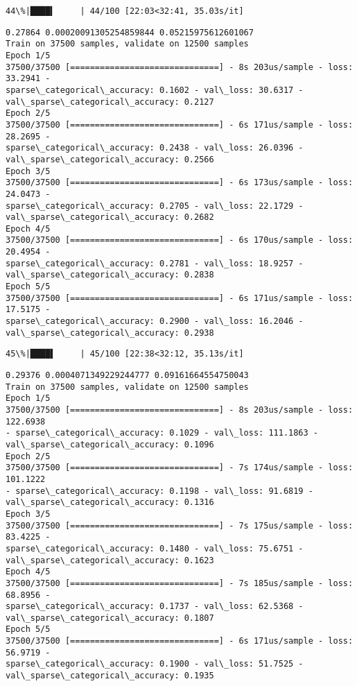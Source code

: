 \documentclass[11pt]{article}
\begin{document}
    \begin{Verbatim}[commandchars=\\\{\}]
 44\%|████▍     | 44/100 [22:03<32:41, 35.03s/it]
    \end{Verbatim}

    \begin{Verbatim}[commandchars=\\\{\}]
0.27864 0.00020091305254859844 0.05215975612601067
Train on 37500 samples, validate on 12500 samples
Epoch 1/5
37500/37500 [==============================] - 8s 203us/sample - loss: 33.2941 -
sparse\_categorical\_accuracy: 0.1602 - val\_loss: 30.6317 -
val\_sparse\_categorical\_accuracy: 0.2127
Epoch 2/5
37500/37500 [==============================] - 6s 171us/sample - loss: 28.2695 -
sparse\_categorical\_accuracy: 0.2438 - val\_loss: 26.0396 -
val\_sparse\_categorical\_accuracy: 0.2566
Epoch 3/5
37500/37500 [==============================] - 6s 173us/sample - loss: 24.0473 -
sparse\_categorical\_accuracy: 0.2705 - val\_loss: 22.1729 -
val\_sparse\_categorical\_accuracy: 0.2682
Epoch 4/5
37500/37500 [==============================] - 6s 170us/sample - loss: 20.4954 -
sparse\_categorical\_accuracy: 0.2781 - val\_loss: 18.9257 -
val\_sparse\_categorical\_accuracy: 0.2838
Epoch 5/5
37500/37500 [==============================] - 6s 171us/sample - loss: 17.5175 -
sparse\_categorical\_accuracy: 0.2900 - val\_loss: 16.2046 -
val\_sparse\_categorical\_accuracy: 0.2938
    \end{Verbatim}

    \begin{Verbatim}[commandchars=\\\{\}]
 45\%|████▌     | 45/100 [22:38<32:12, 35.13s/it]
    \end{Verbatim}

    \begin{Verbatim}[commandchars=\\\{\}]
0.29376 0.0004071349229244777 0.09161664554750043
Train on 37500 samples, validate on 12500 samples
Epoch 1/5
37500/37500 [==============================] - 8s 203us/sample - loss: 122.6938
- sparse\_categorical\_accuracy: 0.1029 - val\_loss: 111.1863 -
val\_sparse\_categorical\_accuracy: 0.1096
Epoch 2/5
37500/37500 [==============================] - 7s 174us/sample - loss: 101.1222
- sparse\_categorical\_accuracy: 0.1198 - val\_loss: 91.6819 -
val\_sparse\_categorical\_accuracy: 0.1316
Epoch 3/5
37500/37500 [==============================] - 7s 175us/sample - loss: 83.4225 -
sparse\_categorical\_accuracy: 0.1480 - val\_loss: 75.6751 -
val\_sparse\_categorical\_accuracy: 0.1623
Epoch 4/5
37500/37500 [==============================] - 7s 185us/sample - loss: 68.8956 -
sparse\_categorical\_accuracy: 0.1737 - val\_loss: 62.5368 -
val\_sparse\_categorical\_accuracy: 0.1807
Epoch 5/5
37500/37500 [==============================] - 6s 171us/sample - loss: 56.9719 -
sparse\_categorical\_accuracy: 0.1900 - val\_loss: 51.7525 -
val\_sparse\_categorical\_accuracy: 0.1935
    \end{Verbatim}
\end{document}
